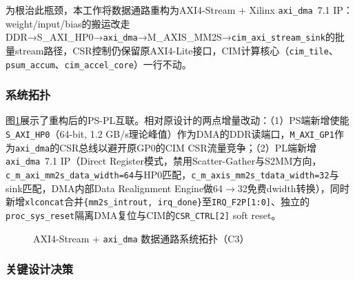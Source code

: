 \documentclass[12pt, a4paper]{article}
\begin{document}
为根治此瓶颈，本工作将数据通路重构为AXI4-Stream + Xilinx \texttt{axi\_dma}~7.1 IP：weight/input/bias的搬运改走DDR→S\_AXI\_HP0→\texttt{axi\_dma}→M\_AXIS\_MM2S→\texttt{cim\_axi\_stream\_sink}的批量stream路径，CSR控制仍保留原AXI4-Lite接口，CIM计算核心（\texttt{cim\_tile}、\texttt{psum\_accum}、\texttt{cim\_accel\_core}）一行不动。

\subsubsection{系统拓扑}

图\ref{fig:c3_topology}展示了重构后的PS-PL互联。相对原设计的两点增量改动：（1）PS端新增使能\texttt{S\_AXI\_HP0}（64-bit, 1.2 GB/s理论峰值）作为DMA的DDR读端口，\texttt{M\_AXI\_GP1}作为\texttt{axi\_dma}的CSR总线以避开原GP0的CIM CSR流量竞争；（2）PL端新增\texttt{axi\_dma}~7.1 IP（Direct Register模式，禁用Scatter-Gather与S2MM方向，\texttt{c\_m\_axi\_mm2s\_data\_width=64}与HP0匹配，\texttt{c\_m\_axis\_mm2s\_tdata\_width=32}与sink匹配，DMA内部Data Realignment Engine做64$\to$32免费dwidth转换），同时新增\texttt{xlconcat}合并\texttt{\{mm2s\_introut, irq\_done\}}至\texttt{IRQ\_F2P[1:0]}、独立的\texttt{proc\_sys\_reset}隔离DMA复位与CIM的\texttt{CSR\_CTRL[2]} soft reset。

\begin{figure}[H]
    \centering
    \caption{AXI4-Stream + \texttt{axi\_dma} 数据通路系统拓扑（C3）}
    \label{fig:c3_topology}
\end{figure}

\subsubsection{关键设计决策}
\end{document}
